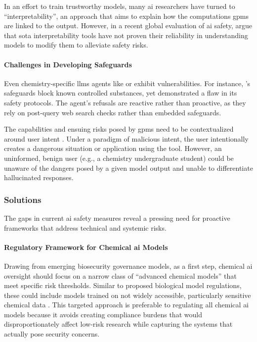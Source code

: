 In an effort to train trustworthy models, many \gls{ai} researchers have turned to \enquote{interpretability}, an approach that aims to explain how the computations \glspl{gpm} are linked to the output. \autocite{cunningham2023sparse} 
However, in a recent global evaluation of \gls{ai} safety, \textcite{bengio2025international} argue that \gls{sota} interpretability tools have not proven their reliability in understanding models to modify them to alleviate safety risks.\autocite{makelov2023subspace}

\paragraph{Challenges in Developing Safeguards} Even chemistry-specific \glspl{llm} agents like  \autocite{bran2024augmenting} or \autocite{boiko2023autonomous} exhibit vulnerabilities. For instance, 's safeguards block known controlled substances, yet \textcite{he2023control} demonstrated a flaw in its safety protocols. 
The agent's refusals are reactive rather than proactive, as they rely on post-query web search checks rather than embedded safeguards. 

The capabilities and ensuing risks posed by \glspl{gpm} need to be contextualized around user intent \autocite{tang2024prioritizing}. 
Under a paradigm of malicious intent, the user intentionally creates a dangerous situation or application using the tool. 
However, an uninformed, benign user (e.g., a chemistry undergraduate student) could be unaware of the dangers posed by a given model output and unable to differentiate hallucinated responses. 

\subsubsection{Solutions}

The gaps in current \gls{ai} safety measures reveal a pressing need for proactive frameworks that address technical and systemic risks. \autocite{bengio2025international}

\paragraph{Regulatory Framework for Chemical \gls{ai} Models} Drawing from emerging biosecurity governance models, as a first step, chemical \gls{ai} oversight should focus on a narrow class of \enquote{advanced chemical models} that meet specific risk thresholds.  
Similar to proposed biological model regulations, these could include models trained on not widely accessible, particularly sensitive chemical data \autocite{bloomfield2024ai}. 
This targeted approach is preferable to regulating all chemical \gls{ai} models because it avoids creating compliance burdens that would disproportionately affect low-risk research while capturing the systems that actually pose security concerns.

